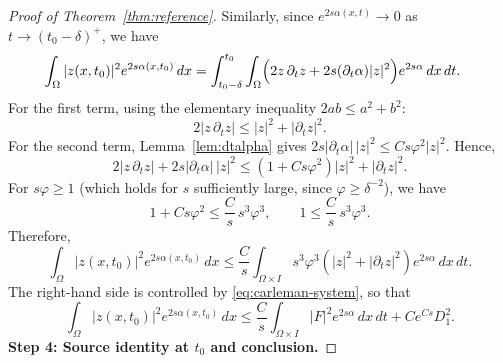 \documentclass[12pt]{amsart}
\theoremstyle{plain}
\theoremstyle{definition}
\theoremstyle{remark}
\newcommand{\p}{\partial}
\newcommand{\Om}{\Omega}
\begin{document}
\begin{proof}[Proof of Theorem~\ref{thm:reference}]
Similarly, since $e^{2s\alpha(x,t)}\to0$ as $t\to (t_0-\delta)^+$, we have
\begin{align}
\int_\Om |z(x,t_0)|^2 e^{2s\alpha(x,t_0)}\,dx
&=\int_{t_0-\delta}^{t_0}\int_\Om
\Bigl(2z\,\p_t z+2s(\p_t\alpha)|z|^2\Bigr)
e^{2s\alpha}\,dx\,dt.
\label{eq:z-identity}
\end{align}
For the first term, using the elementary inequality $2ab\le a^2+b^2$:
\[
2|z\,\p_t z|\le |z|^2+|\p_t z|^2.
\]
For the second term, Lemma~\ref{lem:dtalpha} gives
$2s|\p_t\alpha|\,|z|^2\le Cs\varphi^2|z|^2$.
Hence,
\[
2|z\,\p_t z|+2s|\p_t\alpha|\,|z|^2
\le (1+Cs\varphi^2)|z|^2+|\p_t z|^2.
\]
For $s\varphi\ge 1$ (which holds for $s$ sufficiently large, since
$\varphi\ge\delta^{-2}$), we have
\[
1+Cs\varphi^2\le \frac{C}{s}\,s^3\varphi^3,\qquad
1\le \frac{C}{s}\,s^3\varphi^3.
\]
Therefore,
\begin{equation}\label{eq:z-bound}
\int_\Om |z(x,t_0)|^2 e^{2s\alpha(x,t_0)}\,dx
\le \frac{C}{s}\int_{\Om\times I} s^3\varphi^3
\left(|z|^2+|\p_t z|^2\right)e^{2s\alpha}\,dx\,dt.
\end{equation}
The right-hand side is controlled by \eqref{eq:carleman-system}, so that
\begin{equation}\label{eq:z-final}
\int_\Om |z(x,t_0)|^2 e^{2s\alpha(x,t_0)}\,dx
\le \frac{C}{s}\int_{\Om\times I}|F|^2 e^{2s\alpha}\,dx\,dt
+ C e^{Cs} D_1^2.
\end{equation}
\medskip
\noindent\textbf{Step 4: Source identity at $t_0$ and conclusion.}


\end{proof}
\end{document}
